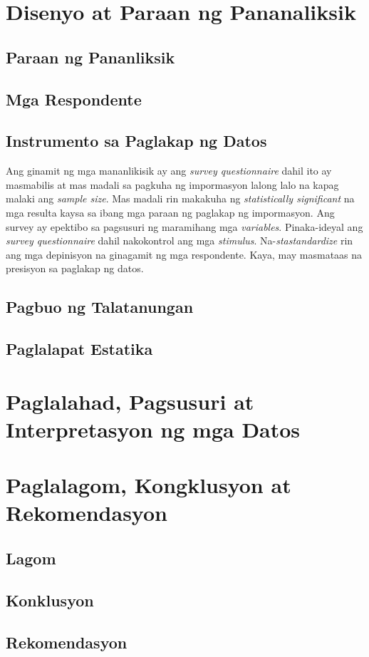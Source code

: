 \documentclass [11pt] {report}
\begin{document}
\chapter{Disenyo at Paraan ng Pananaliksik}
\section{Paraan ng Pananliksik}
\section{Mga Respondente}
\section{Instrumento sa Paglakap ng Datos}
Ang ginamit ng mga mananlikisik ay ang \emph{survey questionnaire} dahil ito ay
masmabilis at mas madali sa pagkuha ng impormasyon lalong lalo na kapag malaki
ang \emph{sample size}. Mas madali rin makakuha ng \emph{statistically
  significant} na mga resulta kaysa sa ibang mga paraan ng paglakap ng
impormasyon. Ang survey ay epektibo sa pagsusuri ng maramihang mga
\emph{variables}. Pinaka-ideyal ang \emph{survey questionnaire } dahil
nakokontrol ang mga \emph{stimulus}. Na-\emph{stastandardize} rin ang mga
depinisyon na ginagamit ng mga respondente. Kaya, may masmataas na presisyon sa
paglakap ng datos.

\section{Pagbuo ng Talatanungan}
\section{Paglalapat Estatika}

\chapter{Paglalahad, Pagsusuri at Interpretasyon ng mga Datos}
\chapter{Paglalagom, Kongklusyon at Rekomendasyon}
\section{Lagom}
\section{Konklusyon}
\section{Rekomendasyon}



\end{document}
